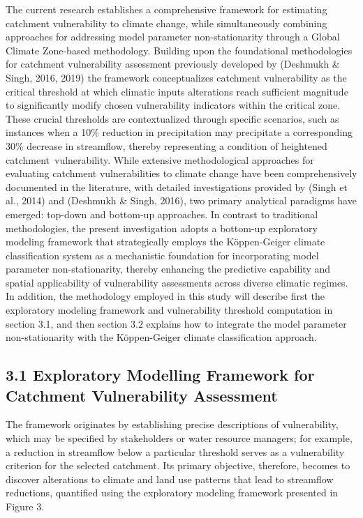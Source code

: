\documentclass[
]{article}
\begin{document}
The current research establishes a comprehensive framework for
estimating catchment vulnerability to climate change, while
simultaneously combining approaches for addressing model parameter
non-stationarity through a Global Climate Zone-based methodology.
Building upon the foundational methodologies for catchment vulnerability
assessment previously developed by (Deshmukh \& Singh, 2016, 2019) the
framework conceptualizes catchment vulnerability as the critical
threshold at which climatic inputs alterations reach sufficient
magnitude to significantly modify chosen vulnerability indicators within
the critical zone. These crucial thresholds are contextualized through
specific scenarios, such as instances when a 10\% reduction in
precipitation may precipitate a corresponding 30\% decrease in
streamflow, thereby representing a condition of heightened
catchment~vulnerability. While extensive methodological approaches for
evaluating catchment vulnerabilities to climate change have been
comprehensively documented in the literature, with detailed
investigations provided by (Singh et al., 2014) and (Deshmukh \& Singh,
2016), two primary analytical paradigms have emerged: top-down and
bottom-up approaches. In contrast to traditional methodologies, the
present investigation adopts a bottom-up exploratory modeling framework
that strategically employs the Köppen-Geiger climate classification
system as a mechanistic foundation for incorporating model parameter
non-stationarity, thereby enhancing the predictive capability and
spatial applicability of vulnerability assessments across diverse
climatic regimes. In addition, the methodology employed in this study
will describe first the exploratory modeling framework and vulnerability
threshold computation in section 3.1, and then section 3.2 explains how
to integrate the model parameter non-stationarity with the Köppen-Geiger
climate classification approach.

\subsection{3.1 Exploratory Modelling Framework for Catchment
Vulnerability
Assessment}\label{exploratory-modelling-framework-for-catchment-vulnerability-assessment}

The framework originates by establishing precise descriptions of
vulnerability, which may be specified by stakeholders or water resource
managers; for example, a reduction in streamflow below a particular
threshold serves as a vulnerability criterion for the selected
catchment. Its primary objective, therefore, becomes to discover
alterations to climate and land use patterns that lead to streamflow
reductions, quantified using the exploratory modeling framework
presented in Figure 3.
\end{document}

